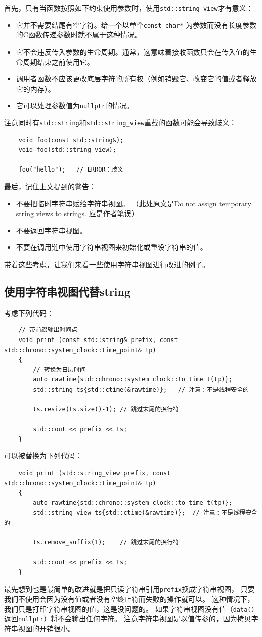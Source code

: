 首先，只有当函数按照如下约束使用参数时，使用\texttt{std::string\_view}才有意义：
\begin{itemize}
    \item 它并不需要结尾有空字符。给一个以单个\texttt{const char*}
    为参数而没有长度参数的C函数传递参数时就不属于这种情况。
    \item 它不会违反传入参数的生命周期。通常，这意味着接收函数只会在传入值的生命周期结束之前使用它。
    \item 调用者函数不应该更改底层字符的所有权（例如销毁它、改变它的值或者释放它的内存）。
    \item 它可以处理参数值为\texttt{nullptr}的情况。
\end{itemize}
注意同时有\texttt{std::string}和\texttt{std::string\_view}重载的函数可能会导致歧义：
\begin{lstlisting}
    void foo(const std::string&);
    void foo(std::string_view);

    foo("hello");   // ERROR：歧义
\end{lstlisting}
最后，记住\hyperref[ch19.3.1]{上文提到的警告}：
\begin{itemize}
    \item 不要把临时字符串赋给字符串视图。
    （此处原文是Do not assign temporary string views to strings. 应是作者笔误）
    \item 不要返回字符串视图。
    \item 不要在调用链中使用字符串视图来初始化或重设字符串的值。
\end{itemize}
带着这些考虑，让我们来看一些使用字符串视图进行改进的例子。

\subsection{使用字符串视图代替string}
考虑下列代码：
\begin{lstlisting}
    // 带前缀输出时间点
    void print (const std::string& prefix, const std::chrono::system_clock::time_point& tp)
    {
        // 转换为日历时间
        auto rawtime{std::chrono::system_clock::to_time_t(tp)};
        std::string ts{std::ctime(&rawtime)};   // 注意：不是线程安全的

        ts.resize(ts.size()-1); // 跳过末尾的换行符

        std::cout << prefix << ts;
    }
\end{lstlisting}
可以被替换为下列代码：
\begin{lstlisting}
    void print (std::string_view prefix, const std::chrono::system_clock::time_point& tp)
    {
        auto rawtime{std::chrono::system_clock::to_time_t(tp)};
        std::string_view ts{std::ctime(&rawtime)};  // 注意：不是线程安全的

        ts.remove_suffix(1);    // 跳过末尾的换行符

        std::cout << prefix << ts;
    }
\end{lstlisting}
最先想到也是最简单的改进就是把只读字符串引用\texttt{prefix}换成字符串视图，
只要我们不使用会因为没有值或者没有空终止符而失败的操作就可以。
这种情况下，我们只是打印字符串视图的值，这是没问题的。
如果字符串视图没有值（\texttt{data()}返回\texttt{nullptr}）将不会输出任何字符。
注意字符串视图是以值传参的，因为拷贝字符串视图的开销很小。

